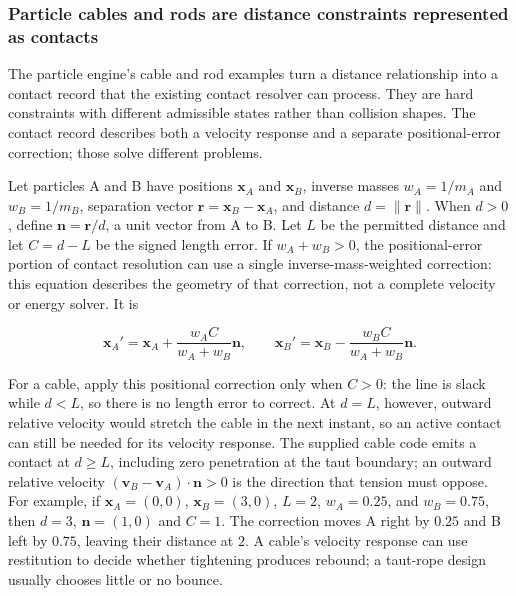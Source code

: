 \subsubsection{Particle cables and rods are distance constraints represented as contacts}\label{06-engine-ii-ch033-particle-cables-and-rods-are-distance-constraints-represented-as-contacts}

The particle engine's cable and rod examples turn a distance relationship into a contact record that the existing contact resolver can process. They are hard constraints with different admissible states rather than collision shapes. The contact record describes both a velocity response and a separate positional-error correction; those solve different problems.

Let particles A and B have positions \(\mathbf{x}_A\) and \(\mathbf{x}_B\), inverse masses \(w_A=1/m_A\) and \(w_B=1/m_B\), separation vector \(\mathbf{r}=\mathbf{x}_B-\mathbf{x}_A\), and distance \(d=\lVert\mathbf{r}\rVert\). When \(d>0\), define \(\mathbf{n}=\mathbf{r}/d\), a unit vector from A to B. Let \(L\) be the permitted distance and let \(C=d-L\) be the signed length error. If \(w_A+w_B>0\), the positional-error portion of contact resolution can use a single inverse-mass-weighted correction: this equation describes the geometry of that correction, not a complete velocity or energy solver. It is

\[
\mathbf{x}_A' = \mathbf{x}_A + \frac{w_A C}{w_A+w_B}\mathbf{n}, \qquad
\mathbf{x}_B' = \mathbf{x}_B - \frac{w_B C}{w_A+w_B}\mathbf{n}.
\]

For a cable, apply this positional correction only when \(C>0\): the line is slack while \(d<L\), so there is no length error to correct. At \(d=L\), however, outward relative velocity would stretch the cable in the next instant, so an active contact can still be needed for its velocity response. The supplied cable code emits a contact at \(d\geq L\), including zero penetration at the taut boundary; an outward relative velocity \((\mathbf v_B-\mathbf v_A)\cdot\mathbf n>0\) is the direction that tension must oppose. For example, if \(\mathbf{x}_A=(0,0)\), \(\mathbf{x}_B=(3,0)\), \(L=2\), \(w_A=0.25\), and \(w_B=0.75\), then \(d=3\), \(\mathbf{n}=(1,0)\) and \(C=1\). The correction moves A right by \(0.25\) and B left by \(0.75\), leaving their distance at \(2\). A cable's velocity response can use restitution to decide whether tightening produces rebound; a taut-rope design usually chooses little or no bounce.


